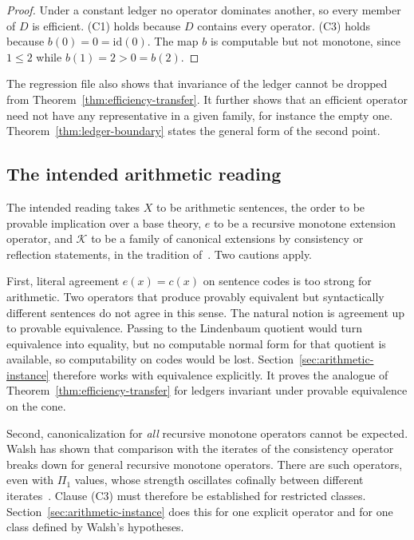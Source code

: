 \begin{proof}
Under a constant ledger no operator dominates another, so every member of $D$ is efficient. (C1) holds because $D$ contains every operator. (C3) holds because $b(0)=0=\mathrm{id}(0)$. The map $b$ is computable but not monotone, since $1\le 2$ while $b(1)=2>0=b(2)$.
\end{proof}

The regression file also shows that invariance of the ledger cannot be dropped from Theorem~\ref{thm:efficiency-transfer}. It further shows that an efficient operator need not have any representative in a given family, for instance the empty one. Theorem~\ref{thm:ledger-boundary} states the general form of the second point.

\subsection{The intended arithmetic reading}

The intended reading takes $X$ to be arithmetic sentences, the order to be provable implication over a base theory, $e$ to be a recursive monotone extension operator, and $\mathcal{K}$ to be a family of canonical extensions by consistency or reflection statements, in the tradition of~\cite{Turing1939,Feferman1962,BeklemishevReflection,PakhomovWalsh2021}. Two cautions apply.

First, literal agreement $e(x)=c(x)$ on sentence codes is too strong for arithmetic. Two operators that produce provably equivalent but syntactically different sentences do not agree in this sense. The natural notion is agreement up to provable equivalence. Passing to the Lindenbaum quotient would turn equivalence into equality, but no computable normal form for that quotient is available, so computability on codes would be lost. Section~\ref{sec:arithmetic-instance} therefore works with equivalence explicitly. It proves the analogue of Theorem~\ref{thm:efficiency-transfer} for ledgers invariant under provable equivalence on the cone.

Second, canonicalization for \emph{all} recursive monotone operators cannot be expected. Walsh has shown that comparison with the iterates of the consistency operator breaks down for general recursive monotone operators. There are such operators, even with $\Pi_1$ values, whose strength oscillates cofinally between different iterates~\cite{Walsh2022Evitable}. Clause (C3) must therefore be established for restricted classes. Section~\ref{sec:arithmetic-instance} does this for one explicit operator and for one class defined by Walsh's hypotheses.
